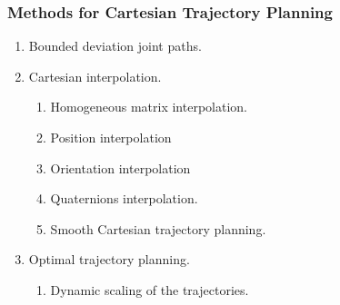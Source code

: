 \documentclass[10pt, aspectratio=169]{beamer}
\theoremstyle{remark}
\theoremstyle{definition}
\begin{document}
\begin{frame}[allowframebreaks]
\frametitle{Methods for Cartesian Trajectory Planning}
\begin{enumerate}
    \item Bounded deviation joint paths.

    \item Cartesian interpolation.
    
    \begin{enumerate}
        \item Homogeneous matrix interpolation.
        \item Position interpolation
        \item Orientation interpolation
        \item Quaternions interpolation.
        \item Smooth Cartesian trajectory planning.
    \end{enumerate}
    

    \item Optimal trajectory planning.
    \begin{enumerate}
        \item Dynamic scaling of the trajectories.
    \end{enumerate}

\end{enumerate}
\end{frame}
\end{document}

